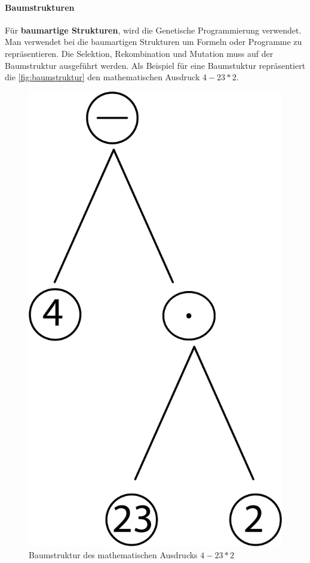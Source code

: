 \paragraph{Baumstrukturen}
F{\"u}r \textbf{baumartige Strukturen}, wird die Genetische Programmierung verwendet. Man verwendet bei die baumartigen Strukturen um Formeln oder Programme zu repr{\"a}sentieren. Die Selektion, Rekombination und Mutation muss auf der Baumstruktur ausgef{\"u}hrt werden.
Als Beispiel f{\"u}r eine Baumstuktur repr{\"a}sentiert die \autoref{fig:baumstruktur} den mathematischen Ausdruck $4 - 23 * 2$.

\begin{figure}
	\centering
    \includegraphics[heigth=5cm]{pics/grundlage/baumstruktur.png}
    \caption{Baumstruktur des mathematischen Ausdrucks $4 - 23 * 2$}
    \label{fig:baumstruktur}
\end{figure}






